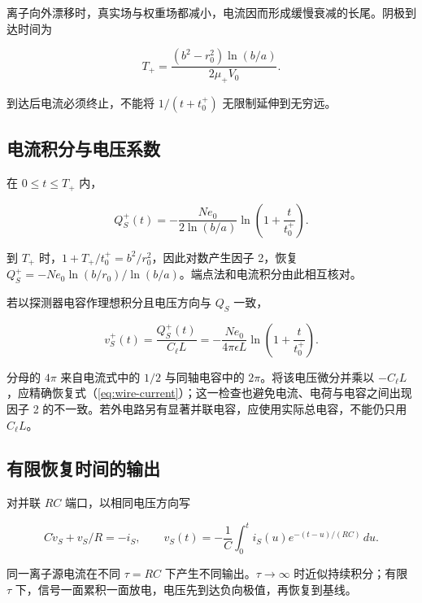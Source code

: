 \documentclass[
  11pt,
  a4paper,
  oneside,
  openany]{report}
\numberwithin{equation}{chapter}
\begin{document}
离子向外漂移时，真实场与权重场都减小，电流因而形成缓慢衰减的长尾。阴极到达时间为

\begin{equation}
T_+=\frac{(b^2-r_0^2)\ln(b/a)}{2\mu_+V_0}.
\end{equation}

到达后电流必须终止，不能将 \(1/(t+t_0^+)\) 无限制延伸到无穷远。

\subsection{电流积分与电压系数}\label{ux7535ux6d41ux79efux5206ux4e0eux7535ux538bux7cfbux6570}

在 \(0\le t\le T_+\) 内，

\begin{equation}
Q_S^+(t)=-\frac{Ne_0}{2\ln(b/a)}
\ln\left(1+\frac{t}{t_0^+}\right).
\label{eq:wire-charge}
\end{equation}

到 \(T_+\) 时，\(1+T_+/t_0^+=b^2/r_0^2\)，因此对数产生因子 2，恢复
\(Q_S^+=-Ne_0\ln(b/r_0)/\ln(b/a)\)。端点法和电流积分由此相互核对。

若以探测器电容作理想积分且电压方向与 \(Q_S\) 一致，

\begin{equation}
v_S^+(t)=\frac{Q_S^+(t)}{C_\ell L}
=-\frac{Ne_0}{4\pi\epsilon L}
\ln\left(1+\frac{t}{t_0^+}\right).
\end{equation}

分母的 \(4\pi\) 来自电流式中的 \(1/2\) 与同轴电容中的
\(2\pi\)。将该电压微分并乘以
\(-C_\ell L\)，应精确恢复式（\ref{eq:wire-current}）；这一检查也避免电流、电荷与电容之间出现因子
2 的不一致。若外电路另有显著并联电容，应使用实际总电容，不能仍只用
\(C_\ell L\)。

\subsection{有限恢复时间的输出}\label{ux6709ux9650ux6062ux590dux65f6ux95f4ux7684ux8f93ux51fa}

对并联 \(RC\) 端口，以相同电压方向写

\begin{equation}
C\dot v_S+v_S/R=-i_S,\qquad
v_S(t)=-\frac1C\int_0^t i_S(u)e^{-(t-u)/(RC)}\,du.
\end{equation}

同一离子源电流在不同 \(\tau=RC\) 下产生不同输出。\(\tau\to\infty\)
时近似持续积分；有限 \(\tau\)
下，信号一面累积一面放电，电压先到达负向极值，再恢复到基线。
\end{document}
